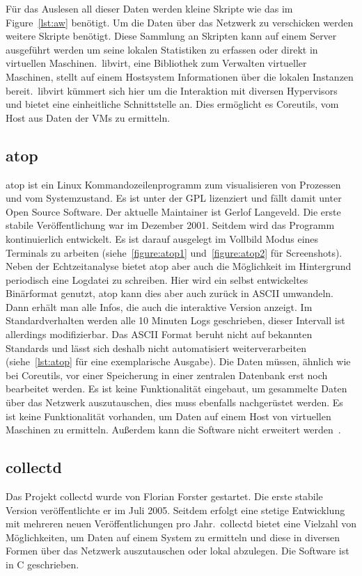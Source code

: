 Für das Auslesen all dieser Daten werden kleine Skripte wie das im
Figure~\ref{lst:aw} benötigt. Um die Daten über das Netzwerk zu verschicken
werden weitere Skripte benötigt. Diese Sammlung an Skripten kann auf einem
Server ausgeführt werden um seine lokalen Statistiken zu erfassen oder direkt
in virtuellen Maschinen.\ libvirt, eine Bibliothek zum Verwalten virtueller
Maschinen, stellt auf einem Hostsystem Informationen über die lokalen Instanzen
bereit.\ libvirt kümmert sich hier um die Interaktion mit diversen Hypervisors
und bietet eine einheitliche Schnittstelle an. Dies ermöglicht es Coreutils,
vom Host aus Daten der VMs zu ermitteln.
\tm%

\subsection{atop}
atop ist ein Linux Kommandozeilenprogramm zum visualisieren von Prozessen und
vom Systemzustand. Es ist unter der GPL lizenziert und fällt damit unter Open
Source Software. Der aktuelle \gls{Maintainer} ist Gerlof Langeveld. Die erste
stabile Veröffentlichung war im Dezember 2001. Seitdem wird das Programm
kontinuierlich entwickelt. Es ist darauf ausgelegt im Vollbild Modus eines
Terminals zu arbeiten (siehe~\ref{figure:atop1} und~\ref{figure:atop2} für
Screenshots). Neben der Echtzeitanalyse bietet atop aber auch die Möglichkeit
im Hintergrund periodisch eine Logdatei zu schreiben. Hier wird ein selbst
entwickeltes Binärformat genutzt, atop kann dies aber auch zurück in ASCII
umwandeln. Dann erhält man alle Infos, die auch die interaktive Version
anzeigt. Im Standardverhalten werden alle 10 Minuten Logs geschrieben, dieser
Intervall ist allerdings modifizierbar. Das ASCII Format beruht nicht auf
bekannten Standards und lässt sich deshalb nicht automatisiert
weiterverarbeiten (siehe~\ref{lst:atop} für eine exemplarische Ausgabe). Die
Daten müssen, ähnlich wie bei Coreutils, vor einer Speicherung in einer
zentralen Datenbank erst noch bearbeitet werden. Es ist keine Funktionalität
eingebaut, um gesammelte Daten über das Netzwerk auszutauschen, dies muss
ebenfalls nachgerüstet werden. Es ist keine Funktionalität vorhanden, um Daten
auf einem Host von virtuellen Maschinen zu ermitteln. Außerdem kann die
Software nicht erweitert werden~\cite{atop}.
\tm%

\subsection{collectd}
Das Projekt collectd wurde von Florian Forster gestartet. Die erste stabile
Version veröffentlichte er im Juli 2005. Seitdem erfolgt eine stetige
Entwicklung mit mehreren neuen Veröffentlichungen pro Jahr.\ collectd bietet
eine Vielzahl von Möglichkeiten, um Daten auf einem System zu ermitteln und
diese in diversen Formen über das Netzwerk auszutauschen oder lokal abzulegen.
Die Software ist in C geschrieben.

